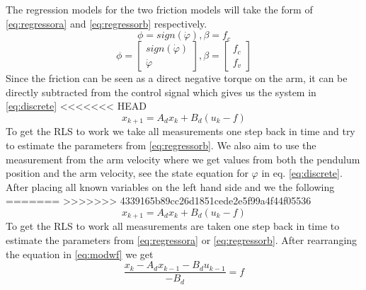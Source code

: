\documentclass[10pt,a4paper]{article}
\begin{document}
The regression models for the two friction models will take the form of \ref{eq:regressora} and \ref{eq:regressorb} respectively.
\begin{equation}
\phi=sign(\dot{\varphi}), \beta = f_c
\label{eq:regressora}
\end{equation}
\begin{equation}
\phi=\begin{bmatrix}
sign(\dot{\varphi}) \\
\dot{\varphi}
\end{bmatrix}, \beta = \begin{bmatrix}
f_c\\
f_v
\end{bmatrix}
\label{eq:regressorb}
\end{equation}
Since the friction can be seen as a direct negative torque on the arm, it can be directly subtracted from the control signal which gives us the system in \ref{eq:discrete}
<<<<<<< HEAD
$$x_{k+1} = A_dx_k + B_d(u_k - f)$$
To get the RLS to work we take all measurements one step back in time and try to estimate the parameters from \ref{eq:regressorb}. We also aim to use the measurement from the arm velocity where we get values from both the pendulum position and the arm velocity, see the state equation for $ \varphi $  in eq. \ref{eq:discrete}. After placing all known variables on the left hand side and we the following
=======
>>>>>>> 4339165b89cc26d1851cede2e5f99a4f44f05536
\begin{equation}
 x_{k+1} = A_dx_k + B_d(u_k - f)
\label{eq:modwf}
\end{equation}
To get the RLS to work all measurements are taken one step back in time to estimate the parameters from \ref{eq:regressora} or \ref{eq:regressorb}. After rearranging the equation in \ref{eq:modwf} we get
\begin{equation}
 \dfrac{x_{k}-A_dx_{k-1}-B_d u_{k-1}}{-B_d} =   f
\label{eq:estim}
\end{equation}
\end{document}

